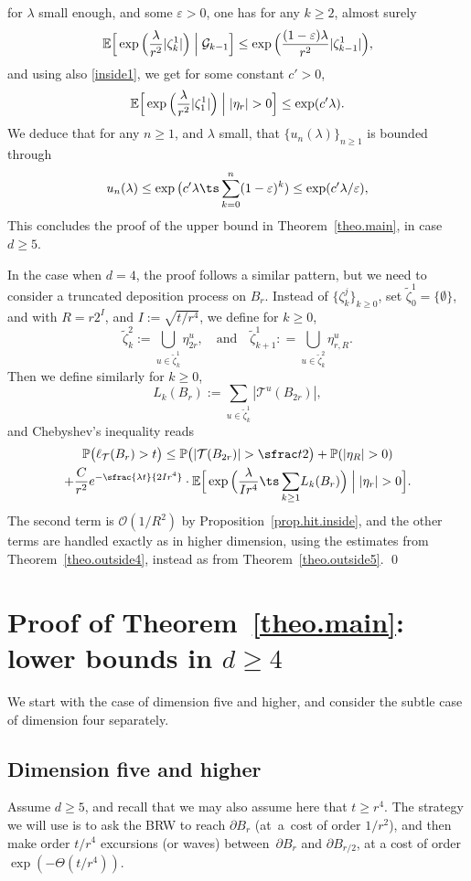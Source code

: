 for $\lambda$ small enough, and some $\varepsilon>0$, one has for any $k\ge 2$, almost surely
\[
\mathbb E\Big[\exp\Big(\frac{\lambda}{r^2}|\zeta_k^1| \Big)\Bigm|\mathcal G_{k-1} \Big] \le \exp\Big(\frac{(1-\varepsilon)\lambda}{r^2} |\zeta_{k-1}^1|\Big),
\]
and using also \eqref{inside1}, we get for some constant $c'>0$,
\[
\mathbb E\Big[\exp\Big(\frac{\lambda}{r^2}|\zeta_1^1| \Big)\Bigm| |\eta_r|> 0 \Big] \le \exp(c'\lambda).
\]
We deduce that for any $n\ge 1$, and $\lambda$ small,
that $\{u_n(\lambda)\}_{n\ge 1}$ is bounded through
\[
u_n(\lambda) \le \exp\big(c'\lambda\ts
\sum_{k=0}^n (1-\varepsilon)^k)\le \exp(c'\lambda/\varepsilon),
\]
This concludes the proof of the upper bound in Theorem~\ref{theo.main},
in case $d\ge 5$.

In the case when $d=4$, the proof follows a similar pattern, but we
need to consider a truncated deposition process on $B_r$.
Instead of $\{\zeta_k^j\}_{k\ge 0}$,
set $\tilde \zeta_0^1 = \{\emptyset\}$, and
with $R = r2^I$, and $I:=\sqrt{t/r^4}$, we define for $k\ge 0$,
\[
\tilde \zeta_k^2:= \bigcup_{u\in \tilde \zeta_k^1} \eta^u_{2r},
\quad \text{and}\quad
\tilde \zeta_{k+1}^1: = \bigcup_{u\in \tilde \zeta_k^2}
\eta^u_{r,R}.
\]
Then we define similarly for $k\ge 0$,
\[
L_k(B_r) := \sum_{u\in \tilde \zeta_k^1} |\mathcal T^u(B_{2r})|,
\]
and Chebyshev's inequality reads
\begin{multline*}%
\mathbb P\big(\ell_{\mathcal T}(B_r)>t\big) \le
\mathbb P\big(|\mathcal T(B_{2r})|>\sfrac t2\big) +
\mathbb P(|\eta_R|>0) \\
+ \frac{C}{r^2}e^{-\sfrac{\lambda t}{2Ir^4}} \cdot
\mathbb E\Big[\exp\Big(\frac{\lambda}{Ir^4}{\ts\sum_{k\ge 1}} L_k(B_r)\Big)\Bigm| |\eta_r|> 0 \Big].
\end{multline*}
The second term is $\mathcal O(1/R^2)$ by Proposition~\ref{prop.hit.inside}, and the other terms are handled exactly as in higher dimension, using the estimates from Theorem~\ref{theo.outside4}, instead as from Theorem~\ref{theo.outside5}. \qed

\section{Proof of Theorem~\ref{theo.main}: lower bounds in \texorpdfstring{$d\ge 4$}{d4}}
\label{sec-LB4}

We start with the case of dimension five and higher,
and consider the subtle case of dimension four separately.

\subsection{Dimension five and higher}
Assume $d\ge 5$, and recall that we may also assume here that $t\ge r^4$.
The strategy we will use is to ask the BRW to reach $\partial B_r$ (at~a~cost of order $1/r^2$),
and then make order $t/r^4$ excursions (or waves) between~$\partial B_r$ and $\partial B_{r/2}$, at a cost of order $\exp(-\Theta(t/r^4))$.

